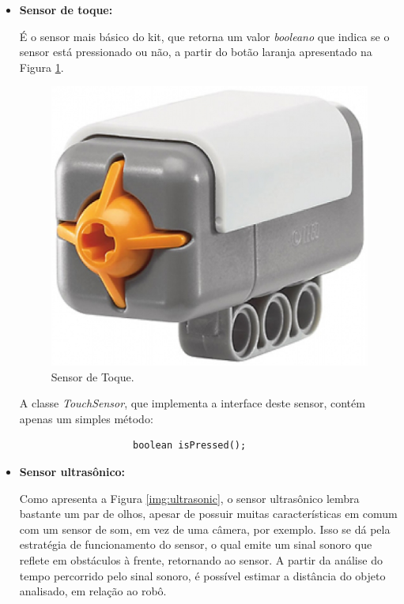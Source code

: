 		\begin{itemize}
			\item \textbf{Sensor de toque:}

				É o sensor mais básico do kit, que retorna um valor \textit{booleano} que indica se o sensor está pressionado ou não, a partir do botão laranja apresentado na Figura \ref{img:sensorToque}.

				\begin{figure}[H]
					\centering
					\includegraphics[scale=0.2]{figuras/sensorToque.eps}
					\caption{Sensor de Toque.}
					\label{img:sensorToque}
				\end{figure}

				A classe \textit{TouchSensor}, que implementa a interface deste sensor, contém apenas um simples método:

				\begin{lstlisting}
					boolean isPressed();
				\end{lstlisting}

			\item \textbf{Sensor ultrasônico:}

				Como apresenta a Figura \ref{img:ultrasonic}, o sensor ultrasônico lembra bastante um par de olhos, apesar de possuir muitas características em comum com um sensor de som, em vez de uma câmera, por exemplo. Isso se dá pela estratégia de funcionamento do sensor, o qual emite um sinal sonoro que reflete em obstáculos à frente, retornando ao sensor. A partir da análise do tempo percorrido pelo sinal sonoro, é possível estimar a distância do objeto analisado, em relação ao robô.


\end{itemize}

